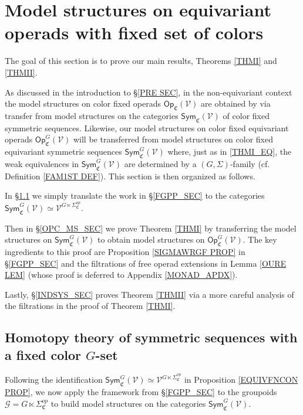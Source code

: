 \documentclass[a4paper,10pt
,draft
]{article}%
\numberwithin{equation}{section}
\numberwithin{figure}{section}
\theoremstyle{definition} %
\newcommand{\V}{\ensuremath{\mathcal V}}
\newcommand{\G}{\ensuremath{\mathcal G}}
\newcommand{\1}{\ensuremath{\mathbbm 1}}%
\begin{document}
\section{Model structures on equivariant operads with fixed set of colors}\label{FIXCOL SEC}


The goal of this section is to prove our main results,
Theorems \ref{THMI} and \ref{THMII}.


As discussed in the introduction to \S \ref{PRE SEC},
in the non-equivariant context the model structures on 
color fixed operads $\mathsf{Op}_{\mathfrak{C}}(\V)$
are obtained by via transfer from model structures on the categories
$\mathsf{Sym}_{\mathfrak{C}}(\V)$
of color fixed symmetric sequences.
Likewise, our model structures 
on color fixed equivariant operads 
$\mathsf{Op}^G_{\mathfrak{C}}(\V)$
will be transferred from model structures on 
color fixed equivariant symmetric sequences
$\mathsf{Sym}^G_{\mathfrak{C}}(\V)$
where, just as in \eqref{THMI_EQ},
the weak equivalences in 
$\mathsf{Sym}^G_{\mathfrak{C}}(\V)$
are determined by a $(G,\Sigma)$-family
(cf. Definition \ref{FAM1ST DEF}).
This section is then organized as follows.

In \S \ref{SYMC_MS_SEC} we simply translate
the work in \S \ref{FGPP_SEC} to the categories 
$\mathsf{Sym}^{G}_{\mathfrak{C}}(\V)
\simeq \V^{G \ltimes \Sigma^{op}_{\mathfrak{C}}}$.

Then in \S \ref{OPC_MS_SEC}
we prove Theorem \ref{THMI} by transferring the model structures on 
$\mathsf{Sym}^{G}_{\mathfrak{C}}(\V)$ to obtain model structures on
$\mathsf{Op}^{G}_{\mathfrak{C}}(\V)$.
The key ingredients to this proof are
Proposition \ref{SIGMAWRGF PROP} in \S \ref{FGPP_SEC} and
the filtrations of free operad extensions 
in Lemma \ref{OURE LEM}
(whose proof is deferred to Appendix \ref{MONAD_APDX}).

Lastly, \S \ref{INDSYS_SEC} proves 
Theorem \ref{THMII} via a more careful analysis
of the filtrations in the proof of Theorem \ref{THMI}.








\subsection{Homotopy theory of symmetric sequences with a fixed color $G$-set}
\label{SYMC_MS_SEC}


Following the identification 
$\mathsf{Sym}^G_{\mathfrak{C}}(\V)
\simeq \V^{G \ltimes \Sigma^{op}_{\mathfrak{C}}}$
in Proposition \ref{EQUIVFNCON PROP},
we now apply the framework from \S \ref{FGPP_SEC}  
to the groupoids
$\G = G \ltimes \Sigma_{\mathfrak C}^{op}$
to build model structures on the categories 
$\mathsf{Sym}^G_{\mathfrak{C}}(\V)$.
%
\end{document}
